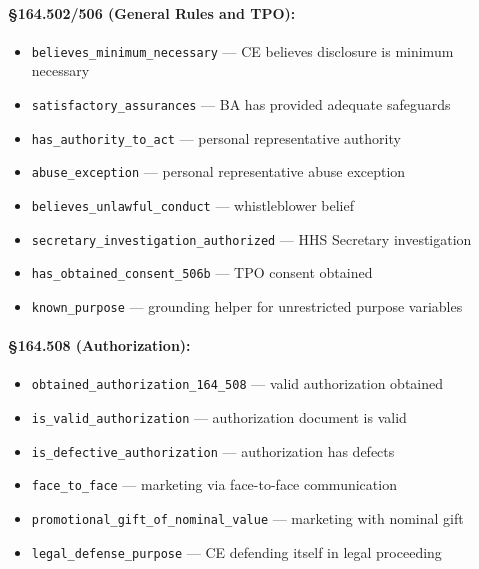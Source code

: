 \documentclass[11pt,letterpaper]{article}
\begin{document}
\paragraph{\S 164.502/506 (General Rules and TPO):}
\begin{itemize}[nosep]
  \item \texttt{believes\_minimum\_necessary} --- CE believes disclosure is minimum necessary
  \item \texttt{satisfactory\_assurances} --- BA has provided adequate safeguards
  \item \texttt{has\_authority\_to\_act} --- personal representative authority
  \item \texttt{abuse\_exception} --- personal representative abuse exception
  \item \texttt{believes\_unlawful\_conduct} --- whistleblower belief
  \item \texttt{secretary\_investigation\_authorized} --- HHS Secretary investigation
  \item \texttt{has\_obtained\_consent\_506b} --- TPO consent obtained
  \item \texttt{known\_purpose} --- grounding helper for unrestricted purpose variables
\end{itemize}

\paragraph{\S 164.508 (Authorization):}
\begin{itemize}[nosep]
  \item \texttt{obtained\_authorization\_164\_508} --- valid authorization obtained
  \item \texttt{is\_valid\_authorization} --- authorization document is valid
  \item \texttt{is\_defective\_authorization} --- authorization has defects
  \item \texttt{face\_to\_face} --- marketing via face-to-face communication
  \item \texttt{promotional\_gift\_of\_nominal\_value} --- marketing with nominal gift
  \item \texttt{legal\_defense\_purpose} --- CE defending itself in legal proceeding
\end{itemize}
\end{document}
